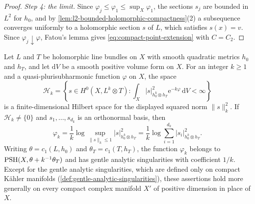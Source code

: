 \begin{proof}
\emph{Step 4: the limit.} Since $\varphi_j\leq\varphi_1\leq\sup_X\varphi_1$, the sections $s_j$ are bounded in $L^2$ for $h_0$, and by \cref{lem:l2-bounded-holomorphic-compactness}(2) a subsequence converges uniformly to a holomorphic section $s$ of $L$, which satisfies $s(x)=v$. Since $\varphi_j\downarrow\varphi$, Fatou's lemma gives \eqref{eq:compact-point-extension} with $C=C_2$.
\end{proof}

\begin{lemma}\label{lem:compact-section-hilbert-space}
Let $L$ and $T$ be holomorphic line bundles on $X$ with smooth quadratic metrics $h_0$ and $h_T$, and let $\mathrm dV$ be a smooth positive volume form on $X$. For an integer $k\geq1$ and a quasi-plurisubharmonic function $\varphi$ on $X$, the space
\[
 \mathcal H_k=\left\{s\in H^0(X,L^k\otimes T):
       \int_X|s|_{h_0^k\otimes h_T}^2\mathrm e^{-k\varphi}\,\mathrm dV<\infty\right\}
\]
is a finite-dimensional Hilbert space for the displayed squared norm $\|s\|_k^2$. If $\mathcal H_k\ne\{0\}$ and $s_1,\ldots,s_{d_k}$ is an orthonormal basis, then
\begin{equation}\label{eq:compact-bergman-potential}
 \varphi_k=\frac1k\log\sup_{\|s\|_k\leq1}|s|_{h_0^k\otimes h_T}^2
          =\frac1k\log\sum_{i=1}^{d_k}|s_i|_{h_0^k\otimes h_T}^2.
\end{equation}
Writing $\theta=c_1(L,h_0)$ and $\theta_T=c_1(T,h_T)$, the function $\varphi_k$ belongs to $\mathrm{PSH}(X,\theta+k^{-1}\theta_T)$ and has gentle analytic singularities with coefficient $1/k$. Except for the gentle analytic singularities, which are defined only on compact K\"ahler manifolds (\cref{def:gentle-analytic-singularities}), these assertions hold more generally on every compact complex manifold $X'$ of positive dimension in place of $X$.
\end{lemma}
